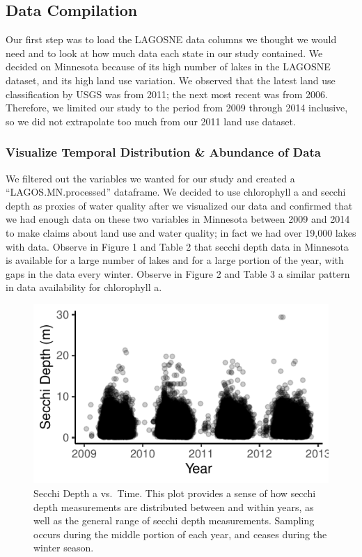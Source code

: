 \documentclass[12pt,]{article}
\begin{document}
\hypertarget{data-compilation}{%
\subsection{Data Compilation}\label{data-compilation}}

Our first step was to load the LAGOSNE data columns we thought we would
need and to look at how much data each state in our study contained. We
decided on Minnesota because of its high number of lakes in the LAGOSNE
dataset, and its high land use variation. We observed that the latest
land use classification by USGS was from 2011; the next most recent was
from 2006. Therefore, we limited our study to the period from 2009
through 2014 inclusive, so we did not extrapolate too much from our 2011
land use dataset.

\hypertarget{visualize-temporal-distribution-abundance-of-data}{%
\subsubsection{Visualize Temporal Distribution \& Abundance of
Data}\label{visualize-temporal-distribution-abundance-of-data}}

We filtered out the variables we wanted for our study and created a
``LAGOS.MN.processed'' dataframe. We decided to use chlorophyll a and
secchi depth as proxies of water quality after we visualized our data
and confirmed that we had enough data on these two variables in
Minnesota between 2009 and 2014 to make claims about land use and water
quality; in fact we had over 19,000 lakes with data. Observe in Figure 1
and Table 2 that secchi depth data in Minnesota is available for a large
number of lakes and for a large portion of the year, with gaps in the
data every winter. Observe in Figure 2 and Table 3 a similar pattern in
data availability for chlorophyll a.

\begin{figure}
\centering
\includegraphics{Bollt_Greif_Raby_Roth_Project_Final_files/figure-latex/Visualize_data-1.pdf}
\caption{Secchi Depth a vs.~Time. This plot provides a sense of how
secchi depth measurements are distributed between and within years, as
well as the general range of secchi depth measurements. Sampling occurs
during the middle portion of each year, and ceases during the winter
season.}
\end{figure}
\end{document}
